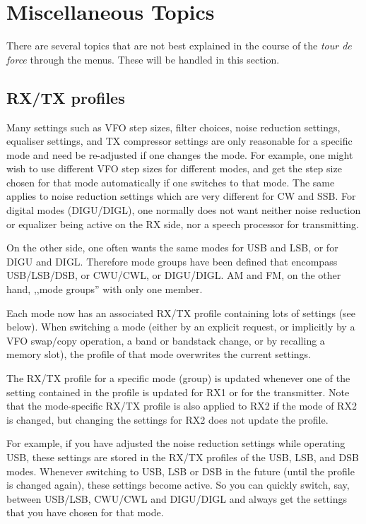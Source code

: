 \documentclass[12pt]{book}
\begin{document}
\chapter{Miscellaneous Topics}
There are several topics that are not best explained in the course of the \textit{tour de force} through
the menus. These will be handled in this section.

\section{RX/TX profiles}
 Many settings such as VFO step sizes, filter choices, noise reduction
settings, equaliser settings, and TX compressor settings
 are only reasonable for a specific mode and need be re-adjusted if one changes
 the mode. For example, one might wish to use
 different VFO step sizes for different modes, and get the step size chosen for that
 mode automatically if one switches to that mode. The same applies to noise reduction
 settings which are very different for CW and SSB. For digital modes (DIGU/DIGL),
 one normally does not want neither noise reduction or equalizer being active on the RX
 side, nor a speech processor for transmitting.

 On the other side, one often wants the same modes for USB and LSB, or for DIGU and DIGL.
 Therefore mode groups have been defined that encompass USB/LSB/DSB, or CWU/CWL, or
 DIGU/DIGL. AM and FM, on the other hand, ,,mode groups'' with only one member.

 Each mode now has an associated RX/TX profile containing lots of settings (see below).
 When switching a mode (either by an explicit request, or implicitly by a VFO swap/copy
 operation, a band or bandstack change, or by recalling a memory slot), the profile of
 that mode overwrites the current settings.

 The RX/TX profile for a specific mode (group) is updated whenever one of the setting
 contained in the profile is updated for RX1 or for the transmitter. Note that the
 mode-specific RX/TX profile is also applied to RX2 if the mode of RX2 is changed,
 but changing the settings for RX2 does not update the profile.

 For example, if you have adjusted the noise reduction settings while operating USB,
 these settings are stored in the RX/TX profiles of the USB, LSB, and DSB modes. Whenever
 switching to USB, LSB or DSB in the future (until the profile is changed again), these
 settings become active. So you can quickly switch, say, between USB/LSB, CWU/CWL and
 DIGU/DIGL and always get the settings that you have chosen for that mode.
\end{document}
